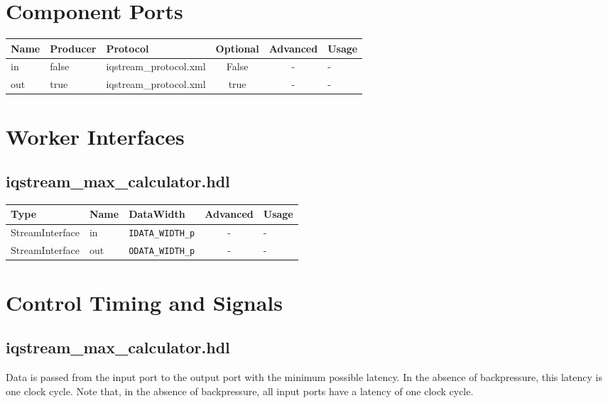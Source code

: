 \documentclass{article}
\def\comp{temp}
\def\comp{iqstream\_max\_calculator}
\def\comp{iqstream\_max\_calculator}
\begin{document}
\begin{landscape}
	\section*{Component Ports}
	\begin{scriptsize}
\begin{tabular}{|M{2cm}|M{1.5cm}|M{4cm}|c|c|M{9cm}|}
\hline
{}
Name & Producer & Protocol & Optional & Advanced & Usage
\\
\hline
in & false & iqstream\_protocol.xml& False & - & -\\
\hline
out & true & iqstream\_protocol.xml& true & - & -\\
\hline
\end{tabular}
	\end{scriptsize}

	\section*{Worker Interfaces}
	\subsection*{\comp.hdl}
	\begin{scriptsize}
\begin{tabular}{|M{2cm}|M{1.5cm}|M{4cm}|c|M{12cm}|}
\hline
{}
Type & Name & DataWidth & Advanced & Usage
\\
\hline
StreamInterface & in & \verb+IDATA_WIDTH_p+ & - & -\\
\hline
StreamInterface & out & \verb+ODATA_WIDTH_p+ & - & -\\
\hline
\end{tabular}
	\end{scriptsize}
\end{landscape}

\section*{Control Timing and Signals}
\subsection*{\comp.hdl}
\begin{flushleft}
Data is passed from the input port to the output port with the minimum possible latency. In the absence of backpressure, this latency is one clock cycle. Note that, in the absence of backpressure, all input ports have a latency of one clock cycle.
\end{flushleft}
\end{document}
